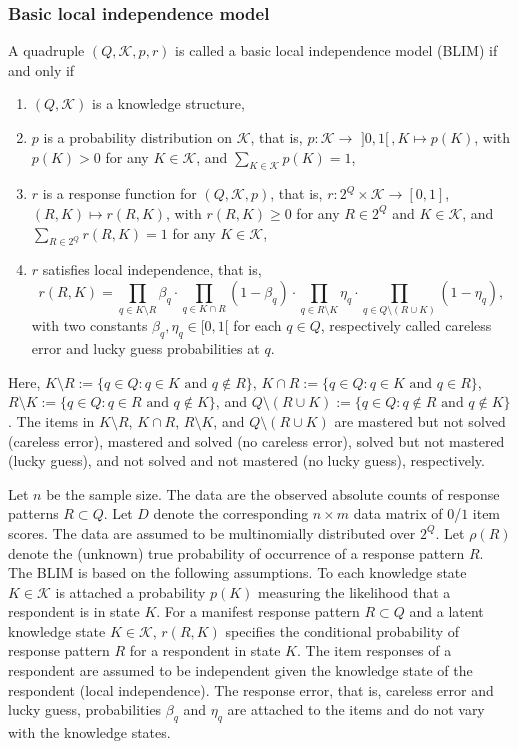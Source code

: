 \documentclass[nojss]{jss}
\begin{document}
\subsubsection{Basic local independence model}

A quadruple $(Q,\mathcal{K},p,r)$ is called a basic local independence model (BLIM) if and only if 
\begin{enumerate}
\item $(Q,\mathcal{K})$ is a knowledge structure, 
\item $p$ is a probability distribution on $\mathcal{K}$, that is, $p:\mathcal{K}\to \,\,]0,1[ \, ,K\mapsto p(K)$, with $p(K)> 0$ for any $K\in\mathcal{K}$, and $\sum_{K\in\mathcal{K}} p(K)=1$,
\item $r$ is a response function for $(Q,\mathcal{K},p)$, that is, $r:2^Q\times \mathcal{K}\to [0,1]$, $(R,K)\mapsto r(R,K)$, with $r(R,K)\geq 0$ for any $R\in 2^Q$ and $K\in \mathcal{K}$, and $\sum_{R\in 2^Q} r(R,K)=1$ for any $K\in \mathcal{K}$,
\item $r$ satisfies local independence, that is,
\begin{displaymath}
r(R,K) = \prod_{q\in K\setminus R}\beta_q \cdot \prod_{q\in K\cap R} (1-\beta_q) \cdot \prod_{q\in R\setminus K}\eta_q \cdot \prod_{q\in Q\setminus(R\cup K)} (1-\eta_q),
\end{displaymath}
with two constants $\beta_q,\eta_q\in [0,1[$ for each $q\in Q$, respectively called careless error and lucky guess probabilities at $q$.
\end{enumerate}
Here, $K\setminus R:=\{q\in Q: q\in K \,\,\mbox{and}\,\, q\not\in R\}$,
$K\cap R:=\{q\in Q: q\in K \,\,\mbox{and}\,\, q\in R\}$, 
$R\setminus K:=\{q\in Q: q\in R \,\,\mbox{and}\,\, q\not\in K\}$, and 
$Q\setminus (R\cup K):=\{q\in Q: q\not\in R \,\,\mbox{and}\,\, q\not\in K\}$. 
The items in $K\setminus R$, $K\cap R$, $R\setminus K$, and 
$Q\setminus (R\cup K)$ are mastered but not solved (careless error), 
mastered and solved (no careless error), solved but not mastered (lucky guess),
and not solved and not mastered (no lucky guess), respectively.

Let $n$ be the sample size. The data are the observed absolute counts of response patterns $R\subset Q$.
Let $D$ denote the corresponding $n\times m$ data matrix of $0$/$1$ item scores.
The data are assumed to be multinomially distributed over $2^Q$. Let $\rho(R)$ denote the 
(unknown) true probability of occurrence of a response pattern $R$.
The BLIM is based on the following assumptions. To each knowledge state $K\in\mathcal{K}$ 
is attached a probability $p(K)$ measuring the likelihood that a respondent is in state $K$.
For a manifest response pattern $R\subset Q$ and a latent knowledge state $K\in\mathcal{K}$, 
$r(R,K)$ specifies the conditional probability of response pattern $R$ for a respondent in state $K$. 
The item responses of a respondent are assumed to be independent 
given the knowledge state of the respondent (local independence). The response error, that is, 
careless error and lucky guess, probabilities $\beta_q$ and $\eta_q$ are attached to the items 
and do not vary with the knowledge states. 
\end{document}
